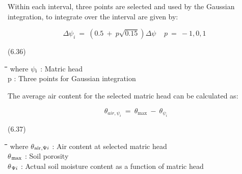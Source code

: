 \documentclass[11pt]{article}
\begin{document}
\bigskip
\bigskip
Within each interval, three points are selected and used by the Gaussian integration, to
integrate over the interval are given by:

\begin{displaymath}
 \Delta  \psi _{i} ~=~ (0.5 ~+~ p \sqrt{0.15} ) \Delta  \psi ~~~~~p~=~-1,0,1~~
\end{displaymath}

 \bigskip
\strut\hfill (6.36)
\nwln
\begin{tabbing}
\hspace{1.27cm}\=\hspace{1.27cm}\=\hspace{1.27cm}\=\hspace{1.27cm}\=%
\hspace{1.27cm}\=\hspace{1.27cm}\=\hspace{1.27cm}\=\hspace{1.27cm}\=%
\hspace{1.27cm}\=\hspace{1.27cm}\=\kill
where\> $\psi$$_{{\rm i}}$\> : Matric head \> \> \> \> \> \> \> \> [cm]\\
\>p\> : Three points for Gaussian integration\> \> \> \> \> \> \> \> [-]
\end{tabbing}

\bigskip
\bigskip
The average air content for the selected matric head can be calculated as:

\begin{displaymath}
\theta  _{air, \psi _{i} } ~=~ \theta _{\max } ~-~ \theta  _{\psi _{i} }
\end{displaymath}

 \bigskip
\strut\hfill (6.37)
\nwln
\begin{tabbing}
\hspace{1.27cm}\=\hspace{1.27cm}\=\hspace{1.27cm}\=\hspace{1.27cm}\=%
\hspace{1.27cm}\=\hspace{1.27cm}\=\hspace{1.27cm}\=\hspace{1.27cm}\=%
\hspace{1.27cm}\=\hspace{1.27cm}\=\kill
where\> $\theta$$_{{\rm air,}{\rm \Psi}{i}}$\> : Air content at selected matric head\> \> \> \> \> \> \> \> [cm$^{{\rm 3}}$ cm$^{{\rm -3}}$]\\
\>$\theta$$_{{\rm max}}$\> : Soil porosity\> \> \> \> \> \> \> \> [cm$^{{\rm 3}}$ cm$^{{\rm -3}}$]\\
\>$\theta$$_{{\rm \Psi}{i}}$\> : Actual soil moisture content as a function of matric head\> \> \> \> \> \> \> \> [cm$^{{\rm 3}}$ cm$^{{\rm -3}}$]
\end{tabbing}
\end{document}
